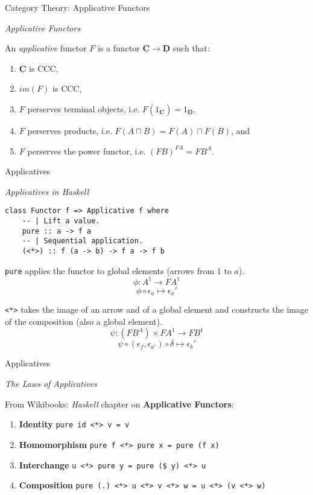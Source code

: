 \documentclass[10pt]{beamer}
\newcommand{\Cat}[1]{\ensuremath{\underline{\mathbf{#1}}}}
\newcommand{\Com}[3]{#3^{#2}}
\newcommand{\strong}[1]{\textbf{#1}}
\theoremstyle{definition}
\theoremstyle{remark}
\numberwithin{equation}{section}
\begin{document}
\begin{frame}[fragile]{Category Theory: Applicative Functors}

  \emph{Applicative Functors}

  An \emph{applicative} functor $F$ is a functor $\Cat{C}\rightarrow \Cat{D}$ such that:
  \begin{enumerate}
    \item $\Cat{C}$ is CCC,
    \item $im(F)$ is CCC,
    \item $F$ perserves terminal objects, i.e. $F(1_{\Cat{C}})=1_{\Cat{D}}$,
    \item $F$ perserves products, i.e. $F(A\sqcap B)=F(A)\sqcap F(B)$, and
    \item $F$ perserves the power functor, i.e. $\Com{D}{F A}{(F B)} = F \Com{C}{A}{B}$.
  \end{enumerate}

\end{frame}

\begin{frame}[fragile]{Applicatives}

  \emph{Applicatives in Haskell}

  \begin{lstlisting}[frame=single]
class Functor f => Applicative f where
    -- | Lift a value.
    pure :: a -> f a
    -- | Sequential application.
    (<*>) :: f (a -> b) -> f a -> f b
  \end{lstlisting}

  \lstinline{pure} applies the functor to global elements (arrows from $1$ to $a$).
  \[
  \phi : \Com{Hask}{1}{A} \rightarrow \Com{Hask}{1}{F A}
  \]
  \[
  \phi \circ \epsilon_a \mapsto \epsilon_a'
  \]

  \lstinline{<*>} takes the image of an arrow and of a global element and constructs the image of the composition (also a global element).
  \[
  \psi : (F \Com{Hask}{A}{B})\times\Com{Hask}{1}{F A} \rightarrow \Com{Hask}{1}{F B}
  \]
  \[
  \psi \circ (\epsilon_{f},\epsilon_{a'}) \circ \delta \mapsto \epsilon_b'
  \]

\end{frame}

\begin{frame}[fragile]{Applicatives}

  \emph{The Laws of Applicatives}

  From Wikibooks: \emph{Haskell} chapter on \strong{Applicative Functors}:
  
  \begin{enumerate}
  \item \strong{Identity}     \lstinline{pure id <*> v = v}
  \item \strong{Homomorphism} \lstinline{pure f <*> pure x = pure (f x)}
  \item \strong{Interchange}  \lstinline{u <*> pure y = pure ($ y) <*> u}
  \item \strong{Composition}  \lstinline{pure (.) <*> u <*> v <*> w = u <*> (v <*> w)}
  \end{enumerate}

\end{frame}
\end{document}
